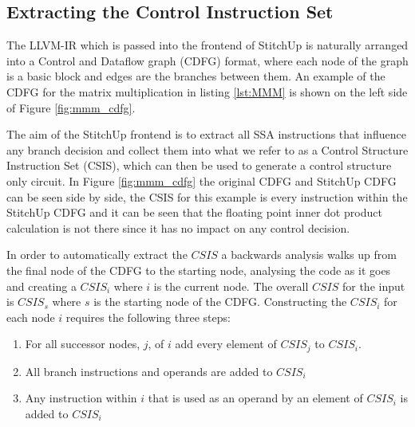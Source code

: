 \subsection{Extracting the Control Instruction Set}
The LLVM-IR which is passed into the frontend of StitchUp is naturally arranged into a Control and Dataflow graph (CDFG) format,
where each node of the graph is a basic block and edges are the branches between them.
An example of the CDFG for the matrix multiplication in listing \ref{lst:MMM}
is shown on the left side of Figure \ref{fig:mmm_cdfg}.

The aim of the StitchUp frontend is to extract all SSA instructions that influence any branch decision and collect them into what
we refer to as a Control Structure Instruction Set (CSIS), which can then be used to generate a control structure only circuit.
In Figure \ref{fig:mmm_cdfg} the original CDFG and StitchUp CDFG can be seen side by side, the CSIS for this example
is every instruction within the StitchUp CDFG and it can be seen that the floating point inner dot product calculation
is not there since it has no impact on any control decision.

In order to automatically extract the $CSIS$ a backwards analysis walks up from the final node of the CDFG to the starting node, analysing
the code as it goes and creating a $CSIS_{i}$ where $i$ is the current node.
The overall $CSIS$ for the input is $CSIS_s$ where $s$ is the starting node of the CDFG.
Constructing the $CSIS_i$ for each node $i$ requires the following three steps:

\vspace{-8pt}
\begin{enumerate}
    \setlength{\itemsep}{1pt}
    \setlength{\parskip}{0pt}
    \setlength{\parsep}{0pt}
    \item For all successor nodes, $j$, of $i$ add every element of $CSIS_j$ to $CSIS_i$.
    \item All branch instructions and operands are added to $CSIS_i$
    \item Any instruction within $i$ that is used as an operand by an element of $CSIS_i$ is added to $CSIS_i$
\end{enumerate}
\vspace{-4pt}

